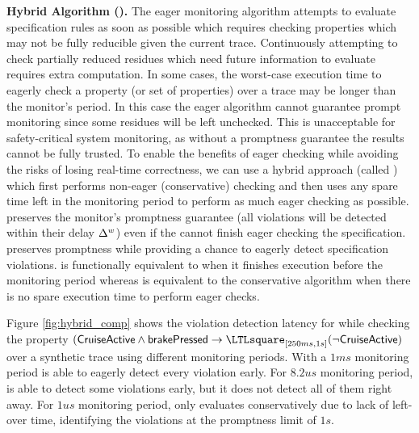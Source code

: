 \noindent\textbf{Hybrid Algorithm (\ha).}
The eager monitoring algorithm attempts to evaluate specification rules as soon as possible
which requires checking properties which may not be fully reducible given the current trace.
Continuously attempting to check partially reduced residues which need future information to evaluate requires extra computation.
In some cases, the worst-case execution time to eagerly check a property (or set of properties) over a trace may be longer than the monitor's period.
In this case the eager algorithm cannot guarantee prompt monitoring since some residues will be left unchecked. This is unacceptable for safety-critical system monitoring, as without a promptness guarantee the results cannot be fully trusted.
%
To enable the benefits of eager checking while avoiding the risks of losing
real-time correctness, we can use a hybrid approach (called \ha) which first performs non-eager
(conservative) checking and then uses any spare time left in the monitoring period to
perform as much eager checking as possible.
\ha preserves the monitor's promptness guarantee (all violations will be
detected within their delay $\Delta^w$) even if the \monitor cannot finish eager
checking the specification.
\ha preserves promptness while providing a chance to eagerly detect specification violations.
\ha is functionally equivalent to \monitor when it finishes
execution before the monitoring period whereas \ha is
equivalent to the conservative algorithm when there is no spare execution time to perform eager checks.

Figure \ref{fig:hybrid_comp} shows the violation detection latency for \ha while
checking  the property $(\pred{CruiseActive} \wedge \pred{brakePressed} \rightarrow \henceforth_{[250ms, 1s]} (\neg \pred{CruiseActive})$
over a synthetic trace using different monitoring periods.
With a $1ms$ monitoring period \ha is able to eagerly detect every violation early.
For $8.2us$ monitoring period, \ha is able to detect some violations early, but it does not detect all of them right away.
For $1us$ monitoring period,  \ha only evaluates conservatively due to lack of left-over time,
identifying the violations at the promptness limit of $1s$.

